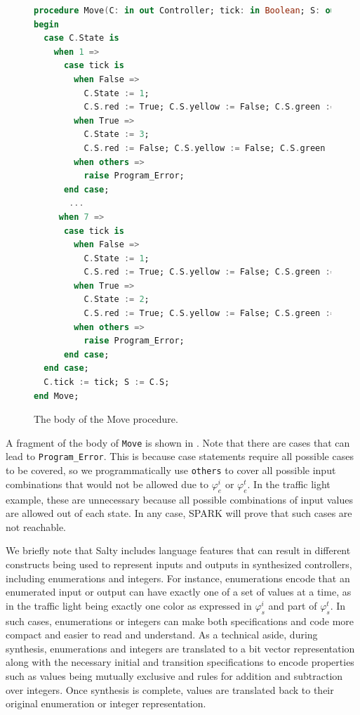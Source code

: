 \documentclass[runningheads]{llncs}
\begin{document}
\begin{figure}
\begin{lstlisting}[language={Ada}, basicstyle=\scriptsize]  
procedure Move(C: in out Controller; tick: in Boolean; S: out System) is
begin
  case C.State is
    when 1 =>
      case tick is
        when False =>
          C.State := 1; 
          C.S.red := True; C.S.yellow := False; C.S.green := False;
        when True =>
          C.State := 3; 
          C.S.red := False; C.S.yellow := False; C.S.green := True;
        when others =>
          raise Program_Error;
      end case;
       ...      
     when 7 =>
      case tick is
        when False =>
          C.State := 1; 
          C.S.red := True; C.S.yellow := False; C.S.green := False;
        when True => 
          C.State := 2; 
          C.S.red := True; C.S.yellow := False; C.S.green := False;
        when others =>
          raise Program_Error;
      end case;
  end case;
  C.tick := tick; S := C.S;
end Move;
\end{lstlisting}
  \caption{The body of the Move procedure.}
  \label{fig:moveBody}
\end{figure}

A fragment of the body of \lstinline{Move} is shown in . 
Note that there are cases that can lead to \lstinline{Program_Error}. 
This is because case statements require all possible cases to be covered, so 
we programmatically use \lstinline{others} to cover all possible input combinations 
that would not be allowed due to $\varphi_e^i$ or $\varphi_e^t$. 
In the traffic light example, these are unnecessary because all possible combinations of input values are 
allowed out of each state. 
In any case, SPARK will prove that such cases are not reachable. 

We briefly note that Salty includes language features that can result in different constructs being used 
to represent inputs and outputs in synthesized controllers, including enumerations and integers.
For instance, enumerations encode that an enumerated input or output can have exactly one of a set of values at a time, 
as in the traffic light being exactly one color as expressed in $\varphi_s^i$ and part  of $\varphi_s^t$. 
In such cases, enumerations or integers can make both specifications and code more compact and easier to read and understand. 
As a technical aside, during synthesis, enumerations and integers are translated to a bit vector representation along with the necessary 
initial and transition specifications to encode properties such as values being mutually exclusive and rules for addition and subtraction over integers. 
Once synthesis is complete, values are translated back to their original enumeration or integer representation.
\end{document}
